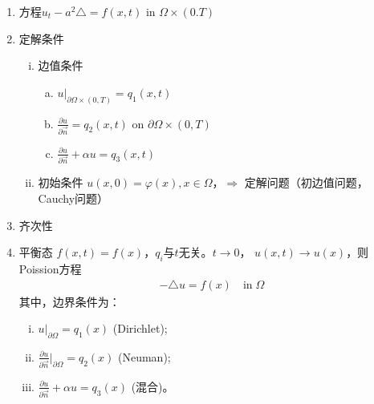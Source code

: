 \documentclass[11pt, a4paper]{article}
\theoremstyle{theorem}
\begin{document}
\begin{enumerate}[(1)]
  \item 方程$u_t - a^2 \triangle = f(x,t)$ in $\Omega \times (0.T)$
  \item 定解条件
  \begin{enumerate}[(i)]
    \item 边值条件
    \begin{enumerate}[(a)]
      \item $u | _{\partial \Omega \times (0,T)} = q_1(x,t)$
      \item $\frac{\partial u}{\partial \vec{n}} = q_2(x,t)$ on $\partial \Omega \times (0,T)$
      \item $\frac{\partial u}{\partial \vec{n}} + \alpha u = q_3(x,t)$
    \end{enumerate}
    \item 初始条件 $u(x,0) = \varphi(x), x \in \Omega$，$\Longrightarrow$ 定解问题（初边值问题，Cauchy问题）
  \end{enumerate}
  \item 齐次性
  \item 平衡态 $f(x,t) = f(x)$，$q_i$与$t$无关。$t \rightarrow 0$， $u(x,t) \rightarrow u(x)$，则Poission方程
  \begin{align}
      - \triangle u = f(x)  \quad \text{in} \; \Omega
  \end{align}
  其中，边界条件为：
  \begin{enumerate}[(i)]
    \item $u|_{\partial \Omega} = q_1(x)$ (Dirichlet);
    \item $\frac{\partial u}{\partial \vec{n}} |_{\partial \Omega} = q_2(x)$ (Neuman);
    \item $\frac{\partial u}{\partial \vec{n}} + \alpha u = q_3(x)$ (混合)。
  \end{enumerate}
\end{enumerate}
\end{document}
